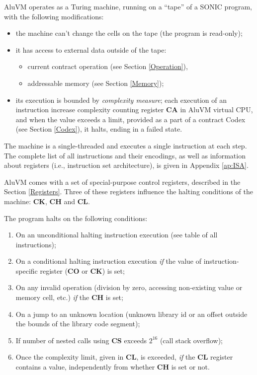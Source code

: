 \documentclass[9pt,oneside]{amsart}
\begin{document}
\begin{multicols}{2}
AluVM operates as a Turing machine, running on a ``tape'' of a SONIC program,
with the following modifications:

\begin{itemize}
\item the machine can't change the cells on the tape (the program is read-only);
\item it has access to external data outside of the tape:
    \begin{itemize}
    \item current contract operation (see Section \ref{Operation}),
    \item addressable memory (see Section \ref{Memory});
    \end{itemize}
\item its execution is bounded by \emph{complexity measure};
    each execution of an instruction increase complexity counting register
    \textbf{CA} in AluVM virtual CPU, and when the value exceeds a limit,
    provided as a part of a contract Codex (see Section \ref{Codex}),
    it halts, ending in a failed state.
\end{itemize}

The machine is a single-threaded and executes a single instruction at each step.
The complete list of all instructions and their encodings,
as well as information about registers (i.e., instruction set architecture),
is given in Appendix \ref{ap:ISA}.

AluVM comes with a set of special-purpose control registers,
described in the Section \ref{Registers}.
Three of these registers influence the halting conditions of the machine:
\textbf{CK}, \textbf{CH} and \textbf{CL}.

The program halts on the following conditions:

\begin{enumerate}
\item On an unconditional halting instruction execution (see table of all instructions);
\item On a conditional halting instruction execution
   \emph{if} the value of instruction-specific register (\textbf{CO} or \textbf{CK}) is set;
\item On any invalid operation (division by zero, accessing non-existing value or memory cell, etc.)
   \emph{if} the \textbf{CH} is set;
\item On a jump to an unknown location
   (unknown library id or an offset outside the bounds of the library code segment);
\item If number of nested calls using \textbf{CS} exceeds $2^{16}$
   (call stack overflow);
\item Once the complexity limit, given in \textbf{CL}, is exceeded,
   \emph{if} the \textbf{CL} register contains a value,
   independently from whether \textbf{CH} is set or not.
\end{enumerate}


\end{multicols}
\end{document}
